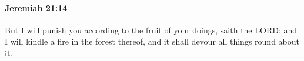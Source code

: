 
		\paragraph{Jeremiah 21:14} %
			\label{JEREMIAH-21-14}

			But I will punish you according to the fruit of your doings, saith the LORD: and I will kindle a fire in the forest thereof, and it shall devour all things round about it.

